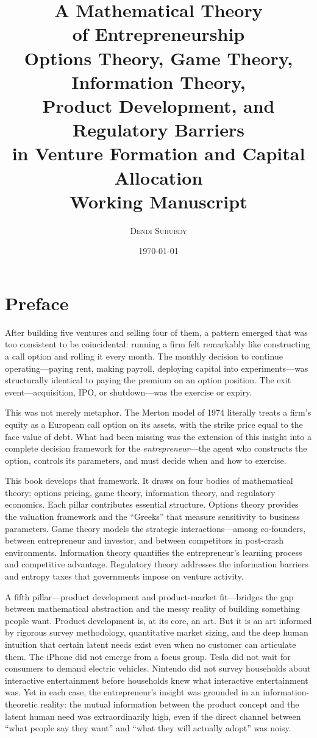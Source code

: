 \documentclass[12pt,a4paper,oneside]{book}
\title{%
  \vspace{-1cm}
  {\Huge\textbf{A Mathematical Theory\\[6pt] of Entrepreneurship}}\\[18pt]
  {\Large Options Theory, Game Theory, Information Theory,\\[4pt]
  Product Development, and Regulatory Barriers\\[4pt]
  in Venture Formation and Capital Allocation}\\[24pt]
  {\large Working Manuscript}
}
\author{
  \textsc{Dendi Suhubdy}
}
\date{\today}
\theoremstyle{definition}
\theoremstyle{remark}
\begin{document}
\maketitle
\thispagestyle{empty}

\chapter*{Preface}

After building five ventures and selling four of them, a pattern emerged that was too
consistent to be coincidental: running a firm felt remarkably like constructing a call
option and rolling it every month. The monthly decision to continue operating---paying
rent, making payroll, deploying capital into experiments---was structurally identical
to paying the premium on an option position. The exit event---acquisition, IPO, or
shutdown---was the exercise or expiry.

This was not merely metaphor. The Merton model of 1974 literally treats a firm's equity
as a European call option on its assets, with the strike price equal to the face value
of debt. What had been missing was the extension of this insight into a complete
decision framework for the \emph{entrepreneur}---the agent who constructs the option,
controls its parameters, and must decide when and how to exercise.

This book develops that framework. It draws on four bodies of mathematical theory:
options pricing, game theory, information theory, and regulatory economics. Each pillar
contributes essential structure. Options theory provides the valuation framework and the
``Greeks'' that measure sensitivity to business parameters. Game theory models the
strategic interactions---among co-founders, between entrepreneur and investor, and
between competitors in post-crash environments. Information theory quantifies the
entrepreneur's learning process and competitive advantage. Regulatory theory addresses
the information barriers and entropy taxes that governments impose on venture activity.

A fifth pillar---product development and product-market fit---bridges the gap between
mathematical abstraction and the messy reality of building something people want. Product
development is, at its core, an art. But it is an art informed by rigorous survey
methodology, quantitative market sizing, and the deep human intuition that certain
latent needs exist even when no customer can articulate them. The iPhone did not emerge
from a focus group. Tesla did not wait for consumers to demand electric vehicles.
Nintendo did not survey households about interactive entertainment before households
knew what interactive entertainment was. Yet in each case, the entrepreneur's insight
was grounded in an information-theoretic reality: the mutual information between the
product concept and the latent human need was extraordinarily high, even if the direct
channel between ``what people say they want'' and ``what they will actually adopt'' was
noisy.
\end{document}
